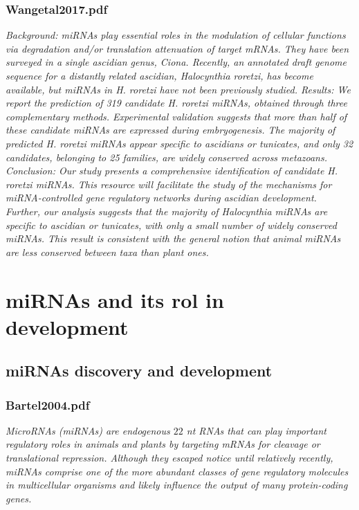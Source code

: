\documentclass[graybox]{svmult}
\begin{document}
\subsubsection{Wangetal2017.pdf}
\cite{Wang2017}
\textit{Background: miRNAs play essential roles in the modulation of cellular functions via degradation and/or translation
attenuation of target mRNAs. They have been surveyed in a single ascidian genus, Ciona. Recently, an annotated
draft genome sequence for a distantly related ascidian, Halocynthia roretzi, has become available, but miRNAs in
H. roretzi have not been previously studied.
Results: We report the prediction of 319 candidate H. roretzi miRNAs, obtained through three complementary
methods. Experimental validation suggests that more than half of these candidate miRNAs are expressed during
embryogenesis. The majority of predicted H. roretzi miRNAs appear specific to ascidians or tunicates, and only 32
candidates, belonging to 25 families, are widely conserved across metazoans.
Conclusion: Our study presents a comprehensive identification of candidate H. roretzi miRNAs. This resource
will facilitate the study of the mechanisms for miRNA-controlled gene regulatory networks during ascidian
development. Further, our analysis suggests that the majority of Halocynthia miRNAs are specific to ascidian
or tunicates, with only a small number of widely conserved miRNAs. This result is consistent with the general
notion that animal miRNAs are less conserved between taxa than plant ones.}

\section{miRNAs and its rol in development}
\label{sec:3}

\subsection{miRNAs discovery and development}
\subsubsection{Bartel2004.pdf}

\cite{Bartel2004}
\textit{MicroRNAs (miRNAs) are endogenous $22$ nt RNAs that can play important regulatory roles in animals and plants by targeting mRNAs for cleavage or translational repression. Although they escaped notice until relatively recently, miRNAs comprise one of the more abundant classes of gene regulatory molecules in multicellular organisms and likely influence the output of many protein-coding genes.}
\end{document}
